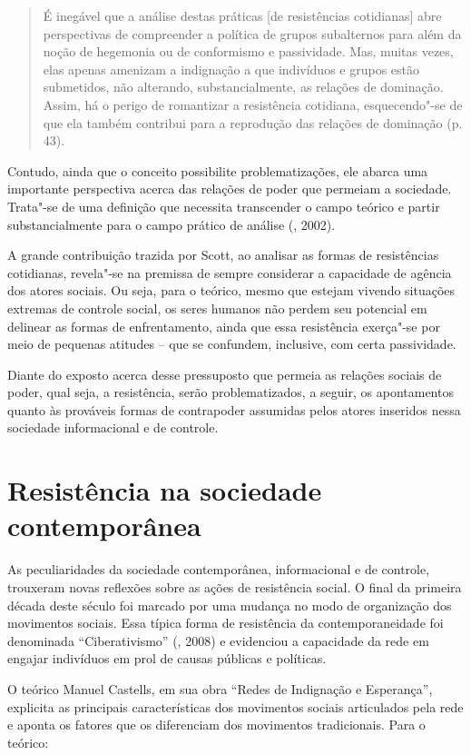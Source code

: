 \begin{quote}
É inegável que a análise destas práticas [de resistências
cotidianas] abre perspectivas de compreender a política de grupos
subalternos para além da noção de hegemonia ou de conformismo e
passividade. Mas, muitas vezes, elas apenas amenizam a indignação a que
indivíduos e grupos estão submetidos, não alterando, substancialmente,
as relações de dominação. Assim, há o perigo de romantizar a resistência
cotidiana, esquecendo"-se de que ela também contribui para a reprodução
das relações de dominação (p. 43).
\end{quote}

Contudo, ainda que o conceito possibilite problematizações, ele abarca
uma importante perspectiva acerca das relações de poder que permeiam a
sociedade. Trata"-se de uma definição que necessita transcender o campo
teórico e partir substancialmente para o campo prático de análise
(, 2002).

A grande contribuição trazida por Scott, ao analisar as formas de
resistências cotidianas, revela"-se na premissa de sempre considerar a
capacidade de agência dos atores sociais. Ou seja, para o teórico, mesmo
que estejam vivendo situações extremas de controle social, os seres
humanos não perdem seu potencial em delinear as formas de enfrentamento,
ainda que essa resistência exerça"-se por meio de pequenas atitudes --
que se confundem, inclusive, com certa passividade.

Diante do exposto acerca desse pressuposto que permeia as relações
sociais de poder, qual seja, a resistência, serão problematizados, a
seguir, os apontamentos quanto às prováveis formas de contrapoder
assumidas pelos atores inseridos nessa sociedade informacional e de
controle.

\section{Resistência na sociedade contemporânea}

As peculiaridades da sociedade contemporânea, informacional e de
controle, trouxeram novas reflexões sobre as ações de resistência
social. O final da primeira década deste século foi marcado por uma
mudança no modo de organização dos movimentos sociais. Essa típica forma
de resistência da contemporaneidade foi denominada ``Ciberativismo''
(, 2008) e evidenciou a capacidade da rede em engajar indivíduos
em prol de causas públicas e políticas.

O teórico Manuel Castells, em sua obra ``Redes de Indignação e
Esperança'', explicita as principais características dos movimentos
sociais articulados pela rede e aponta os fatores que os diferenciam dos
movimentos tradicionais. Para o teórico:

